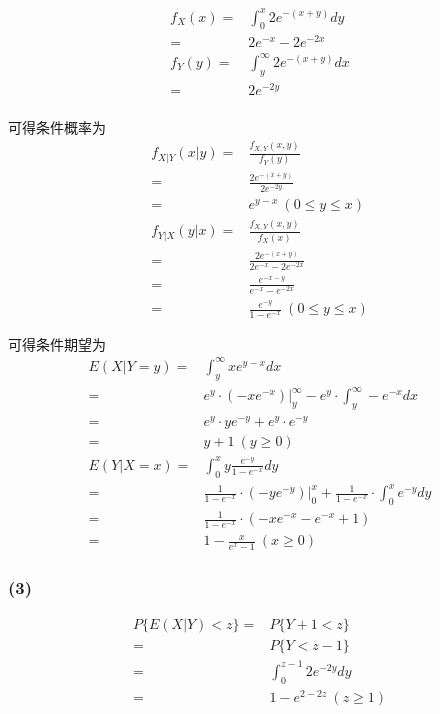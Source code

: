 \documentclass[a4paper,12pt]{ctexart}
\begin{document}
\begin{align*}
	f_X(x) =& \int_{0}^{x} 2e^{-(x+y)} dy \\
	=& 2e^{-x} - 2e^{-2x} \\
	f_Y(y) =& \int_{y}^{\infty} 2e^{-(x+y)} dx \\
	=& 2e^{-2y} \\
\end{align*}

可得条件概率为
\begin{align*}
	f_{X|Y}(x|y) =& \frac{f_{X,Y}(x,y)}{f_Y(y)} \\
	=& \frac{2e^{-(x+y)}}{2e^{-2y}} \\
	=& e^{y-x} \ (0 \leq y \leq x) \\
	f_{Y|X}(y|x) =& \frac{f_{X,Y}(x,y)}{f_X(x)} \\
	=& \frac{2e^{-(x+y)}}{2e^{-x} - 2e^{-2x}} \\
	=& \frac{e^{-x-y}}{e^{-x} - e^{-2x}} \\
	=& \frac{e^{-y}}{1 - e^{-x}} \ (0 \leq y \leq x)
\end{align*}

可得条件期望为
\begin{align*}
	E(X|Y = y) =& \int_{y}^{\infty} x e^{y-x} dx \\
	=& e^y \cdot \left(-x e^{-x}\right) \bigg|_{y}^{\infty} - e^y \cdot \int_{y}^{\infty} -e^{-x} dx \\
	=& e^y \cdot y e^{-y} + e^y \cdot e^{-y} \\
	=& y + 1 \ (y \geq 0) \\
	E(Y|X = x) =& \int_{0}^{x} y \frac{e^{-y}}{1 - e^{-x}} dy \\
	=& \frac{1}{1 - e^{-x}} \cdot \left(-y e^{-y}\right) \bigg|_{0}^{x} + \frac{1}{1 - e^{-x}} \cdot \int_{0}^{x} e^{-y} dy \\
	=& \frac{1}{1 - e^{-x}} \cdot \left(-x e^{-x} - e^{-x} + 1\right) \\
	=& 1 - \frac{x}{e^x-1} \ (x \geq 0)
\end{align*}

\subsubsection*{(3)}

\begin{align*}
	P\{E(X|Y) < z\} =& P\{Y + 1 < z\} \\
	=& P\{Y < z - 1\} \\
	=& \int_{0}^{z-1} 2e^{-2y} dy \\
	=& 1 - e^{2-2z} \ (z \geq 1)
\end{align*}
\end{document}

